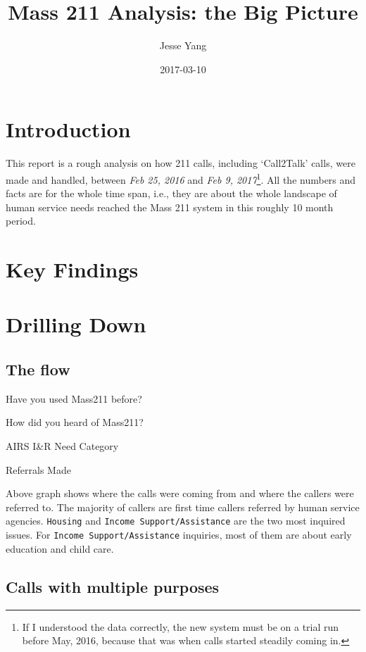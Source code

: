 \documentclass[]{tufte-handout}
\title{Mass 211 Analysis: the Big Picture}
\author{Jesse Yang}
\date{2017-03-10}
\begin{document}
\maketitle




\section{Introduction}\label{introduction}

This report is a rough analysis on how 211 calls, including `Call2Talk'
calls, were made and handled, between \emph{Feb 25, 2016} and \emph{Feb
9, 2017}\footnote{If I understood the data correctly, the new system
  must be on a trial run before May, 2016, because that was when calls
  started steadily coming in.}. All the numbers and facts are for the
whole time span, i.e., they are about the whole landscape of human
service needs reached the Mass 211 system in this roughly 10 month
period.

\section{Key Findings}\label{key-findings}

\section{Drilling Down}\label{drilling-down}

\hypertarget{the-flow}{\subsection{The flow}\label{the-flow}}

Have you used Mass211 before?

How did you heard of Mass211?

AIRS I\&R Need Category

Referrals Made

Above graph shows where the calls were coming from and where the callers
were referred to. The majority of callers are first time callers
referred by human service agencies. \texttt{Housing} and
\texttt{Income\ Support/Assistance} are the two most inquired issues.
For \texttt{Income\ Support/Assistance} inquiries, most of them are
about early education and child care.

\subsection{Calls with multiple
purposes}\label{calls-with-multiple-purposes}
\end{document}
